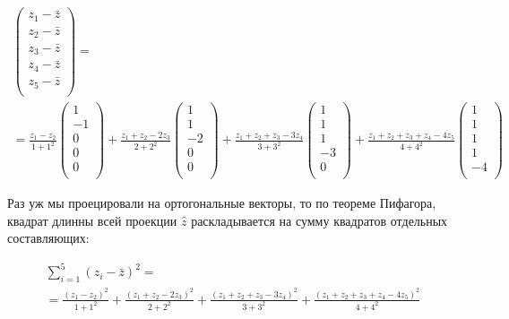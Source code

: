 \documentclass[11pt,russian,]{article}
\newcommand{\1}{\mathbbm{1}}
\begin{document}
\begin{multline}
\nonumber
\begin{pmatrix}
z_1 - \bar z \\
z_2 - \bar z \\
z_3 - \bar z \\
z_4 - \bar z \\
z_5 - \bar z \\
\end{pmatrix} = \\
= \frac{z_1 - z_2}{1+1^2}\begin{pmatrix}
1 \\
-1 \\
0 \\
0 \\
0 \\
\end{pmatrix} +
\frac{z_1 + z_2 - 2z_3}{2+2^2}\begin{pmatrix}
1 \\
1 \\
-2 \\
0 \\
0 \\
\end{pmatrix} +
\frac{z_1 + z_2 + z_3 - 3z_4}{3+3^2}\begin{pmatrix}
1 \\
1 \\
1 \\
-3 \\
0 \\
\end{pmatrix} +
\frac{z_1 + z_2 + z_3 + z_4 - 4z_5}{4+4^2}\begin{pmatrix}
1 \\
1 \\
1 \\
1 \\
-4 \\
\end{pmatrix}
\end{multline}

Раз уж мы проецировали на ортогональные векторы, то по теореме Пифагора,
квадрат длинны всей проекции \(\hat z\) раскладывается на сумму
квадратов отдельных составляющих:

\begin{multline}
\nonumber
\sum_{i=1}^5 (z_i - \bar z)^2 = \\
= \frac{(z_1 - z_2)^2}{1+1^2} + \frac{(z_1 + z_2 - 2z_3)^2}{2+2^2} + \frac{(z_1 + z_2 + z_3 - 3z_4)^2}{3+3^2} + \frac{(z_1 + z_2 + z_3 + z_4 - 4z_5)^2}{4+4^2}
\end{multline}
\end{document}
